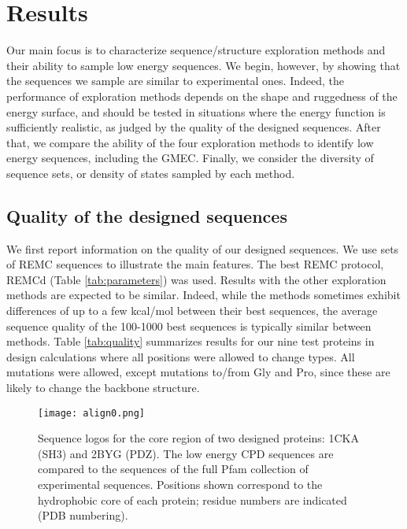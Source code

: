 \section{Results}
Our main focus is to characterize sequence/structure exploration methods and their ability to sample low energy sequences. We begin, however, by showing that the sequences we sample are similar to experimental ones. Indeed, the performance of exploration methods depends on the shape and ruggedness of the energy surface, and should be tested in situations where the energy function is sufficiently realistic, as judged by the quality of the designed sequences. After that, we compare the ability of the four exploration methods to identify low energy sequences, including the GMEC. Finally, we consider the diversity of sequence sets, or density of states sampled by each method.

\subsection{Quality of the designed sequences}
We first report information on the quality of our designed sequences. We use sets of REMC sequences to illustrate the main features. The best REMC protocol, REMCd (Table \ref{tab:parameters}) was used. Results with the other exploration methods are expected to be similar. Indeed, while the methods sometimes exhibit differences of up to a few kcal/mol between their best sequences, the average sequence quality of the 100-1000 best sequences is typically similar between methods. Table \ref{tab:quality} summarizes results for our nine test proteins in design calculations where all positions were allowed to change types. All mutations were allowed, except mutations to/from Gly and Pro, since these are likely to change the backbone structure.
 
\begin{figure}[!htbp]
  \texttt{[image: align0.png]} 
  \caption{
Sequence logos for the core region of two designed proteins: 1CKA (SH3) and 2BYG (PDZ). The low energy CPD sequences are compared to the sequences of the full Pfam collection of
experimental sequences. Positions shown correspond to the hydrophobic core of each protein; residue numbers are indicated (PDB numbering).
}
      \label{fig:logos}
\end{figure}

